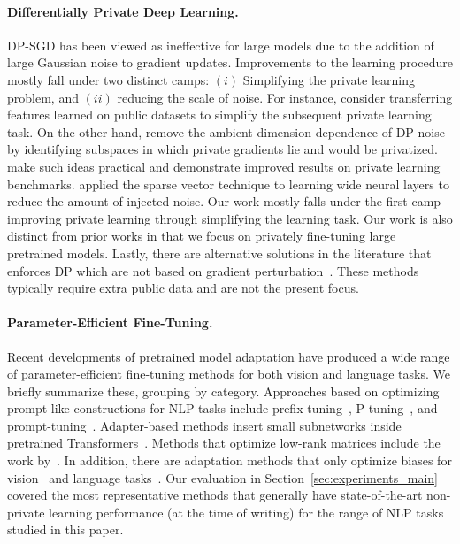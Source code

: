 \paragraph{Differentially Private Deep Learning.}
DP-SGD has been viewed as ineffective for large models due to the addition of large Gaussian noise to gradient updates. 
Improvements to the learning procedure mostly fall under two distinct camps: $(i)$ Simplifying the private learning problem, and $(ii)$ reducing the scale of noise. 
For instance, \cite{papernot2019making,tramer2020differentially,abadi2016deep} consider transferring features learned on public datasets to simplify the subsequent private learning task. 
On the other hand, \cite{zhou2020bypassing,kairouz2020fast} remove the ambient dimension dependence of DP noise by identifying subspaces in which private gradients lie and would be privatized. 
\cite{yu2021not,yu2021large} make such ideas practical and demonstrate improved results on private learning benchmarks. 
\cite{zhang2021wide} applied the sparse vector technique to learning wide neural layers to reduce the amount of injected noise. 
Our work mostly falls under the first camp -- improving private learning through simplifying the learning task.
Our work is also distinct from prior works in that we focus on privately fine-tuning large pretrained models. 
Lastly, there are alternative solutions in the literature that enforces DP which are not based on gradient perturbation~\citep{papernot2018scalable,papernot2016semi}. 
These methods typically require extra public data and are not the present focus. 

\paragraph{Parameter-Efficient Fine-Tuning.}
Recent developments of pretrained model adaptation have produced a wide range of parameter-efficient fine-tuning methods for both vision and language tasks.
We briefly summarize these, grouping by category. 
Approaches based on optimizing prompt-like constructions for NLP tasks include prefix-tuning~\citep{li2021prefix}, P-tuning~\citep{liu2021gpt}, and prompt-tuning~\citep{lester2021power}.
Adapter-based methods insert small subnetworks inside pretrained Transformers~\citep{houlsby2019parameter,ruckle2020adapterdrop,pfeiffer2020adapterfusion}.
Methods that optimize low-rank matrices include the work by~\cite{hu2021lora,mahabadi2021compacter}.
In addition, there are adaptation methods that only optimize biases for vision~\citep{cai2020tinytl} and language tasks~\citep{ben2021bitfit}.
Our evaluation in Section~\ref{sec:experiments_main} covered the most representative methods that generally have state-of-the-art non-private learning performance (at the time of writing) for the range of NLP tasks studied in this paper.

